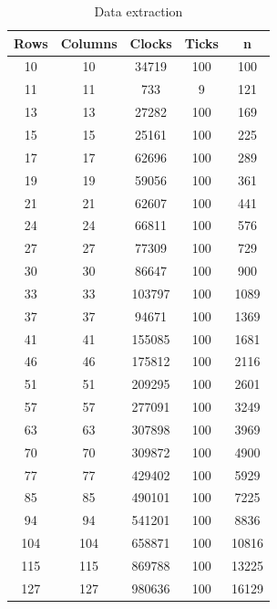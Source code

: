 \documentclass[12pt,a4paper]{report}
\begin{document}
\begin{center}

\begin{table}[ht]
\caption{\label{tab:table-name} Data extraction}
\centering
\begin{tabular}{ccccc}
\hline
\hline
Rows & Columns & Clocks    & Ticks & n       \\ \hline
10   & 10      & 34719     & 100   & 100     \\ \hline
11   & 11      & 733       & 9     & 121     \\ \hline
13   & 13      & 27282     & 100   & 169     \\ \hline
15   & 15      & 25161     & 100   & 225     \\ \hline
17   & 17      & 62696     & 100   & 289     \\ \hline
19   & 19      & 59056     & 100   & 361     \\ \hline
21   & 21      & 62607     & 100   & 441     \\ \hline
24   & 24      & 66811     & 100   & 576     \\ \hline
27   & 27      & 77309     & 100   & 729     \\ \hline
30   & 30      & 86647     & 100   & 900     \\ \hline
33   & 33      & 103797    & 100   & 1089    \\ \hline
37   & 37      & 94671     & 100   & 1369    \\ \hline
41   & 41      & 155085    & 100   & 1681    \\ \hline
46   & 46      & 175812    & 100   & 2116    \\ \hline
51   & 51      & 209295    & 100   & 2601    \\ \hline
57   & 57      & 277091    & 100   & 3249    \\ \hline
63   & 63      & 307898    & 100   & 3969    \\ \hline
70   & 70      & 309872    & 100   & 4900    \\ \hline
77   & 77      & 429402    & 100   & 5929    \\ \hline
85   & 85      & 490101    & 100   & 7225    \\ \hline
94   & 94      & 541201    & 100   & 8836    \\ \hline
104  & 104     & 658871    & 100   & 10816   \\ \hline
115  & 115     & 869788    & 100   & 13225   \\ \hline
127  & 127     & 980636    & 100   & 16129   \\ \hline
\end{tabular}
\end{table}

\end{center}
\end{document}
